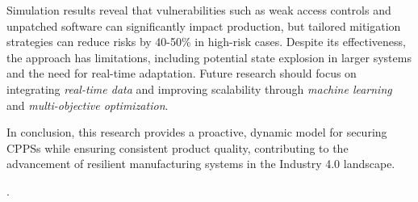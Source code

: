 \documentclass[conference]{IEEEtran}
\begin{document}
Simulation results reveal that vulnerabilities such as weak access controls and unpatched software can significantly impact production, but tailored mitigation strategies can reduce risks by 40-50\% in high-risk cases. Despite its effectiveness, the approach has limitations, including potential state explosion in larger systems and the need for real-time adaptation. Future research should focus on integrating \textit{real-time data} and improving scalability through \textit{machine learning} and \textit{multi-objective optimization}.

In conclusion, this research provides a proactive, dynamic model for securing CPPSs while ensuring consistent product quality, contributing to the advancement of resilient manufacturing systems in the Industry 4.0 landscape.

.


\end{document}
